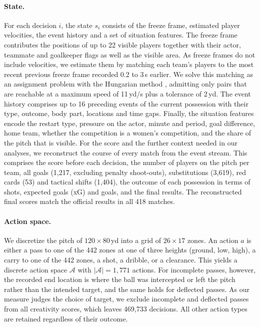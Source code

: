 \paragraph{State.} For each decision $i$, the state $s_i$ consists of the freeze frame, estimated player velocities,
the event history and a set of situation features. The freeze frame contributes the positions of up to 22 visible
players together with their actor, teammate and goalkeeper flags as well as the visible area. As freeze frames do
not include velocities, we estimate them by matching each team's players to the most recent previous freeze frame
recorded 0.2 to 3\,s earlier. We solve this matching as an assignment problem with the Hungarian method
\parencite{kuhn1955hungarian}, admitting only pairs that are reachable at a maximum speed of 11\,yd/s plus a tolerance
of 2\,yd. The event history comprises up to 16 preceding events of the current possession with their type, outcome,
body part, locations and time gaps. Finally, the situation features encode the restart type, pressure on the actor,
minute and period, goal difference, home team, whether the competition is a women's competition, and the share of the
pitch that is visible. For the score and the further context needed in our analyses, we reconstruct the course of
every match from the event stream. This comprises the score before each decision, the number of players on the pitch
per team, all goals (1,217, excluding penalty shoot-outs), substitutions (3,619), red cards (53) and tactical shifts
(1,404), the outcome of each possession in terms of shots, expected goals (xG) and goals, and the final results. The
reconstructed final scores match the official results in all 418 matches.

\paragraph{Action space.} We discretize the pitch of $120 \times 80$\,yd into a grid of $26 \times 17$ zones. An
action $a$ is either a pass to one of the 442 zones at one of three heights (ground, low, high), a carry to one of the
442 zones, a shot, a dribble, or a clearance. This yields a discrete action space $\mathcal{A}$ with
$|\mathcal{A}| = 1{,}771$ actions. For incomplete passes, however, the recorded end location is where the ball was
intercepted or left the pitch rather than the intended target, and the same holds for deflected passes. As our
measure judges the choice of target, we exclude incomplete and deflected passes from all creativity scores, which
leaves 469,733 decisions. All other action types are retained regardless of their outcome.

